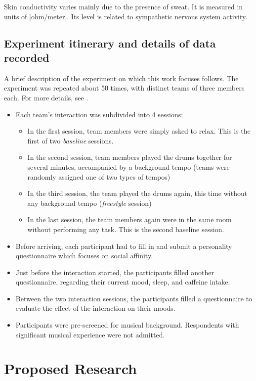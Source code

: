 \documentclass[a4paper, 11pt]{report}      %
\begin{document}
Skin conductivity varies mainly due to the presence of sweat. It is measured in units of [ohm\slash meter]. Its level is related to sympathetic nervous system activity.

\subsection{Experiment itinerary and details of data recorded}
A brief description of the experiment on which this work focuses follows. The experiment was repeated about 50 times, with distinct teams of three members each. For more details, see \cite{gordon2020physio}.
\begin{itemize}
    \item Each team's interaction was subdivided into 4 sessions:
    \begin{itemize}
        \item In the first session, team members were simply asked to relax. This is the first of two \emph{baseline} sessions.
        \item In the second session, team members played the drums together for several minutes, accompanied by a background tempo (teams were randomly assigned one of two types of tempos)
        \item In the third session, the team played the drums again, this time without any background tempo (\emph{freestyle} session)
        \item In the last session, the team members again were in the same room without performing any task. This is the second baseline session.
    \end{itemize}
    \item Before arriving, each participant had to fill in and submit a personality questionnaire which focuses on social affinity.
    \item Just before the interaction started, the participants filled another questionnaire, regarding their current mood, sleep, and caffeine intake.
    \item Between the two interaction sessions, the participants filled a questionnaire to evaluate the effect of the interaction on their moods.
    \item Participants were pre-screened for musical  background. Respondents with significant musical experience were not admitted.
\end{itemize}



\section{Proposed Research}
\end{document}

